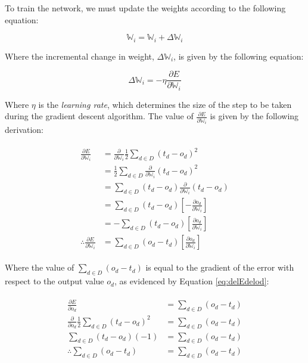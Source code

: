 \documentclass[a4paper]{article}
\begin{document}
To train the network, we must update the weights according to the following equation:

\begin{equation}
    \label{eq:trainW}
    \mathbb W_i = \mathbb W_i + \Delta{\mathbb W_i}
\end{equation}

\newpage

Where the incremental change in weight, $\Delta{\mathbb W_i}$, is given by the following equation:

\begin{equation}
    \label{eq:deltaW}
    \Delta{\mathbb W_i} = -\eta \frac{\partial{E}}{\partial{\mathbb W_i}}
\end{equation}

Where $\eta$ is the \textit{learning rate}, which determines the size of the step to be taken during the gradient descent algorithm. The value of $\frac{\partial{E}}{\partial{\mathbb W_i}}$ is given by the following derivation:

\begin{gather}
    \begin{aligned}
        \frac{\partial{E}}{\partial{\mathbb W_i}} &= \frac{\partial}{\partial{\mathbb W_i}} \frac{1}{2} \sum_{d \in D}(t_d - o_d)^2 \\
        &= \frac{1}{2}\sum_{d \in D}\frac{\partial}{\partial{\mathbb W_i}}(t_d - o_d)^2 \\
        &= \sum_{d \in D}(t_d - o_d)\frac{\partial}{\partial{\mathbb W_i}}(t_d - o_d) \\
        &= \sum_{d \in D}(t_d - o_d)\left[-\frac{\partial{o_d}}{\partial{\mathbb W_i}}\right] \\
        &= -\sum_{d \in D}(t_d - o_d)\left[\frac{\partial{o_d}}{\partial{\mathbb W_i}}\right] \\
        \therefore \frac{\partial{E}}{\partial{\mathbb W_i}} &= \sum_{d \in D}(o_d - t_d)\left[\frac{\partial{o_d}}{\partial{\mathbb W_i}}\right]
    \end{aligned}
\end{gather}

Where the value of $\sum_{d \in D}(o_d - t_d)$ is equal to the gradient of the error with respect to the output value $o_d$, as evidenced by Equation \ref{eq:delEdelod}:

\begin{gather}
    \begin{aligned}
        \label{eq:delEdelod}
        \frac{\partial{E}}{\partial{o_d}} &= \sum_{d \in D}(o_d - t_d) \\
        \frac{\partial}{\partial{o_d}}\frac{1}{2}\sum_{d \in D}(t_d - o_d)^2 &= \sum_{d \in D}(o_d - t_d) \\
        \sum_{d \in D}(t_d - o_d)(-1) &= \sum_{d \in D}(o_d - t_d)\\
        \therefore \sum_{d \in D}(o_d - t_d) &= \sum_{d \in D}(o_d - t_d)
    \end{aligned}
\end{gather}
\end{document}
